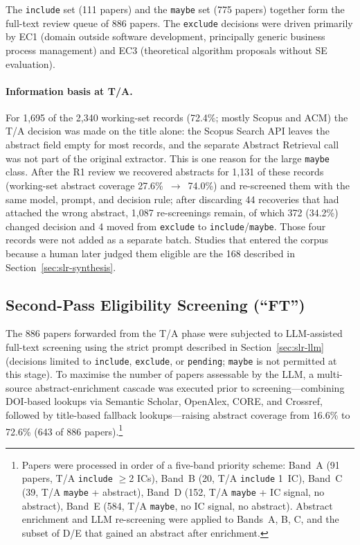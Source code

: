 The \texttt{include} set (111 papers) and the \texttt{maybe} set (775 papers)
together form the full-text review queue of 886 papers. The
\texttt{exclude} decisions were driven primarily by EC1 (domain outside
software development, principally generic business process management) and EC3
(theoretical algorithm proposals without SE evaluation).

\paragraph{Information basis at T/A.} For 1{,}695 of the 2{,}340 working-set
records (72.4\%; mostly Scopus and ACM) the T/A decision was made on the
title alone: the Scopus Search API leaves the abstract field empty for most
records, and the separate Abstract Retrieval call was not part of the
original extractor. This is one reason for the large \texttt{maybe} class.
After the R1 review we recovered abstracts for 1{,}131 of these records
(working-set abstract coverage 27.6\%~$\rightarrow$~74.0\%) and re-screened
them with the same model, prompt, and decision rule; after discarding 44
recoveries that had attached the wrong abstract, 1{,}087 re-screenings
remain, of which 372 (34.2\%) changed decision and 4 moved from
\texttt{exclude} to \texttt{include}/\texttt{maybe}. Those four records were
not added as a separate batch. Studies that entered the corpus because a
human later judged them eligible are the 168 described in
Section~\ref{sec:slr-synthesis}.

\subsection{Second-Pass Eligibility Screening (``FT'')}

The 886 papers forwarded from the T/A phase were subjected to LLM-assisted
full-text screening using the strict prompt described in
Section~\ref{sec:slr-llm} (decisions limited to \texttt{include},
\texttt{exclude}, or \texttt{pending}; \texttt{maybe} is not permitted at this
stage). To maximise the number of papers assessable by the LLM, a
multi-source abstract-enrichment cascade was executed prior to
screening---combining DOI-based lookups via Semantic Scholar, OpenAlex, CORE,
and Crossref, followed by title-based fallback lookups---raising abstract
coverage from 16.6\% to 72.6\% (643 of 886 papers).\footnote{Papers were
  processed in order of a five-band priority scheme: Band~A (91 papers,
  T/A \texttt{include} $\geq$2 ICs), Band~B (20, T/A \texttt{include} 1~IC),
  Band~C (39, T/A \texttt{maybe} + abstract), Band~D (152, T/A \texttt{maybe}
  + IC signal, no abstract), Band~E (584, T/A \texttt{maybe}, no IC signal, no
  abstract). Abstract enrichment and LLM re-screening were applied to Bands~A,
  B, C, and the subset of D/E that gained an abstract after enrichment.}


